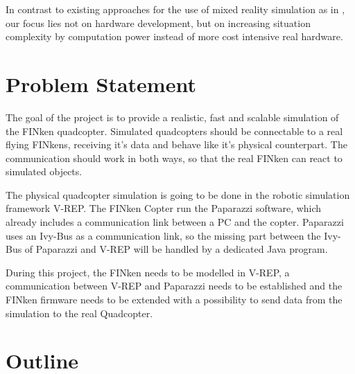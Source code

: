 In contrast to existing approaches for the use of mixed reality simulation as in \cite{Chen2011}, our focus lies not on hardware development, but on increasing situation complexity by computation power instead of more cost intensive real hardware.




       


  
\section{Problem Statement}
    The goal of the project is to provide a realistic, fast and scalable simulation of the FINken quadcopter.  Simulated quadcopters should be connectable to a real flying FINkens, receiving it's    
    \iffalse \gls{IMU} \fi  data and behave like it's physical counterpart. The communication should work in both ways, so that the real FINken can react to simulated objects.

The physical quadcopter simulation is going to be done in the robotic simulation framework V-REP\cite{vrep}. The FINken Copter run the Paparazzi\cite{pprz} software, which already includes a communication link between a PC and the copter. Paparazzi uses an Ivy-Bus as a communication link, so the missing part between the Ivy-Bus of Paparazzi and V-REP will be handled by a dedicated Java program.

During this project, the FINken needs to be modelled in V-REP, a communication between V-REP and Paparazzi needs to be established and the FINken firmware needs to be extended with a possibility to send data from the simulation to the real Quadcopter.
 
         
\section{Outline}
    
   
